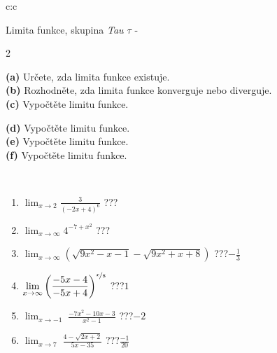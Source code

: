\documentclass[10pt]{report}
\begin{document}
\begin{tabular}{c:c}
\begin{minipage}[c][104.5mm][t]{0.5\linewidth}
\begin{center}
\vspace{7mm}
{\huge Limita funkce, skupina \textit{Tau $\tau$} -}\\[5mm]
\begin{minipage}{0.95\linewidth}
\begin{center}
{\small \begin{multicols}{2} \raggedright
\textbf{(a)} Určete, zda limita funkce existuje. \\[1mm]
\textbf{(b)} Rozhodněte, zda limita funkce konverguje nebo diverguje. \\[1mm]
\textbf{(c)} Vypočtěte limitu funkce. \par \columnbreak
\textbf{(d)} Vypočtěte limitu funkce. \\[1mm]
\textbf{(e)} Vypočtěte limitu funkce. \\[1mm]
\textbf{(f)} Vypočtěte limitu funkce. \\[1mm]
\end{multicols}
}
\end{center}
\end{minipage}
\\[4mm]
\begin{minipage}{0.79\linewidth}
\begin{center}
\begin{varwidth}{\linewidth}
\begin{enumerate}
\normalsize
\item $\displaystyle\lim_{x\to2}{\frac{3}{(-2x+4)^{6}}}$\quad \dotfill\; ???\;\dotfill \quad {}
\item $\displaystyle\lim_{x\to\infty}{4^{-7+x^2}}$\quad \dotfill\; ???\;\dotfill \quad {}
\item $\displaystyle\lim_{x\to\infty}{\left(\sqrt{9x^2-x-1} - \sqrt{9x^2+x+8}\right)}$\quad \dotfill\; ???\;\dotfill \quad $-\frac{1}{3}$
\item $\displaystyle\lim_{x\to\infty}{\left( \frac{-5x-4}{-5x+4} \right)^{\nicefrac{x}{8}}}$\quad \dotfill\; ???\;\dotfill \quad $1$
\item $\displaystyle\lim_{x\to -1}{\;\frac{-7x^2-10x-3}{x^2-1}}$\quad \dotfill\; ???\;\dotfill \quad $-2$
\item $\displaystyle\lim_{x\to 7}{\;\frac{4-\sqrt{2x+2}}{5x-35}}$\quad \dotfill\; ???\;\dotfill \quad $\frac{-1}{20}$
\end{enumerate}

\end{varwidth}
\end{center}
\end{minipage}
\end{center}
\end{minipage}
\end{tabular}
\end{document}
